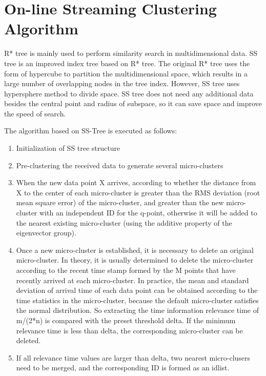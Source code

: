 \documentclass[runningheads]{llncs}
\begin{document}
\section{On-line Streaming Clustering Algorithm}
R* tree is mainly used to perform similarity search in multidimensional data. SS tree is an improved index tree based on R* tree. The original R* tree uses the form of hypercube to partition the multidimensional space, which results in a large number of overlapping nodes in the tree index. However, SS tree uses hypersphere method to divide space. SS tree does not need any additional data besides the central point and radius of subspace, so it can save space and improve the speed of search.

The algorithm based on SS-Tree is executed as follows:
\begin{enumerate}
	\item Initialization of SS tree structure
	\item Pre-clustering the received data to generate several micro-clusters
	\item When the new data point X arrives, according to whether the distance from X to the center of each micro-cluster is greater than the RMS deviation (root mean square error) of the micro-cluster, and greater than the new micro-cluster with an independent ID for the q-point, otherwise it will be added to the nearest existing micro-cluster (using the additive property of the eigenvector group). 
	\item Once a new micro-cluster is established, it is necessary to delete an original micro-cluster. In theory, it is usually determined to delete the micro-cluster according to the recent time stamp formed by the M points that have recently arrived at each micro-cluster. In practice, the mean and standard deviation of arrival time of each data point can be obtained according to the time statistics in the micro-cluster, because the default micro-cluster satisfies the normal distribution. So extracting the time information relevance time of m/(2*n) is compared with the preset threshold delta. If the minimum relevance time is less than delta, the corresponding micro-cluster can be deleted.
	\item If all relevance time values are larger than delta, two nearest micro-clusers need to be merged, and the corresponding ID is formed as an idlist.
\end{enumerate}
\end{document}
